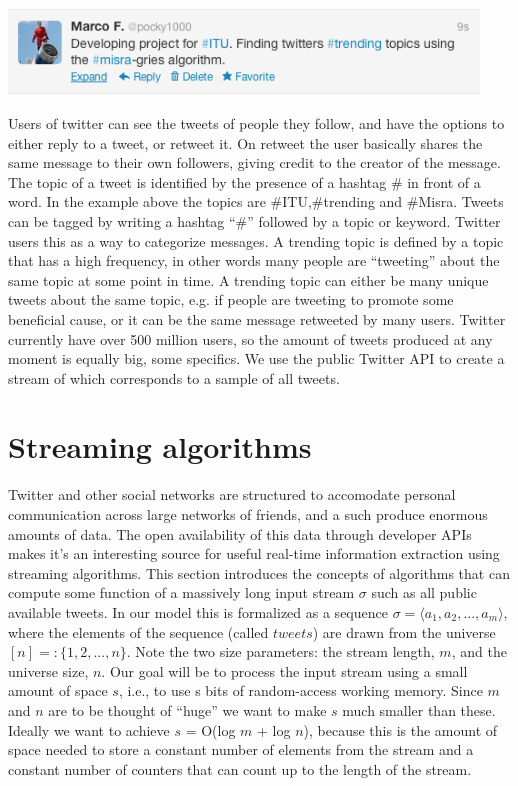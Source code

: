 \documentclass[12pt]{article}
\begin{document}
\includegraphics[width=125mm]{tweet.png}

Users of twitter can see the tweets of people they follow, and have the options to either reply to a tweet, or retweet it. On retweet the user basically shares the same message to their own followers, giving credit to the creator of the message.
The topic of a tweet is identified by the presence of a hashtag \# in front of a word. In the example above the topics are \#ITU,\#trending and \#Misra.
Tweets can be tagged by writing a hashtag ``\#'' followed by a topic or keyword. Twitter users this as a way to categorize messages.
A trending topic is defined by a topic that has a high frequency, in other words many people are ``tweeting'' about the same topic at some point in time. A trending topic can either be many unique tweets about the same topic, e.g. if people are tweeting to promote some beneficial cause, or it can be the same message retweeted by many users.
Twitter currently have over 500 million users, so the amount of tweets produced at any moment is equally big, some specifics. We use the public Twitter API to create a stream of which corresponds to a sample of all tweets. 

\section{Streaming algorithms}\label{related work}
Twitter and other social networks are structured to accomodate personal communication across large networks of friends, and a such produce enormous amounts of data. The open availability of this data through developer APIs makes it's an interesting source for useful real-time information extraction using streaming algorithms. \cite{genderprediction} 
This section introduces the concepts of algorithms that can compute some function of a massively long input stream $\sigma$ such as all public available tweets. In our model this is formalized as a sequence $\sigma = \langle a_{1}, a_{2},...,a_{m}\rangle $, where the elements of the sequence (called $tweets$) are drawn from the universe $[n] =: \{1, 2,..., n\}$. Note the two size parameters: the stream length, $m$, and the universe size, $n$.
Our goal will be to process the input stream using a small amount of space $s$, i.e., to use s bits of random-access working memory. Since $m$ and $n$ are to be thought of ``huge'' we want to make $s$ much smaller than these. Ideally we want to achieve $s$ = O(log $m$ + log $n$), because this is the amount of space needed to store a constant number of elements from the stream and a constant number of counters that can count up to the length of the stream. \cite{Amit}
\end{document}
